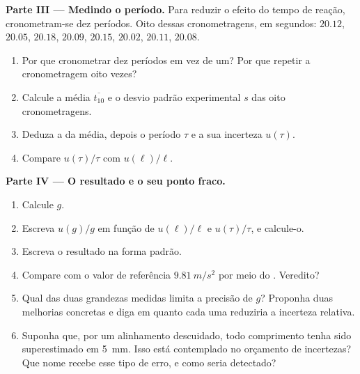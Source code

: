 \begin{problem}
\medskip
\noindent\textbf{Parte III --- Medindo o período.}
Para reduzir o efeito do tempo de reação, cronometram-se dez períodos.
Oito dessas cronometragens, em segundos: $20.12$, $20.05$, $20.18$,
$20.09$, $20.15$, $20.02$, $20.11$, $20.08$.
\begin{enumerate}[resume]
  \item Por que cronometrar dez períodos em vez de um? Por que repetir a
        cronometragem oito vezes?
  \item Calcule a média $\overline{t_{10}}$ e o desvio padrão experimental
        $s$ das oito cronometragens.
  \item Deduza a  da média, depois o período $\tau$ e a
        sua incerteza $u(\tau)$.
  \item Compare $u(\tau)/\tau$ com $u(\ell)/\ell$.
\end{enumerate}

\medskip
\noindent\textbf{Parte IV --- O resultado e o seu ponto fraco.}
\begin{enumerate}[resume]
  \item Calcule $g$.
  \item Escreva $u(g)/g$ em função de $u(\ell)/\ell$ e $u(\tau)/\tau$,
        e calcule-o.
  \item Escreva o resultado na forma padrão.
  \item Compare com o valor de referência $\qty{9.81}{m/s^2}$ por meio do
        . Veredito?
  \item Qual das duas grandezas medidas limita a precisão de
        $g$? Proponha duas melhorias concretas e diga em quanto cada uma
        reduziria a incerteza relativa.
  \item Suponha que, por um alinhamento descuidado, todo comprimento tenha
        sido superestimado em \qty{5}{mm}. Isso está contemplado no
        orçamento de incertezas? Que nome recebe esse tipo de erro,
        e como seria detectado?
\end{enumerate}


\end{problem}
